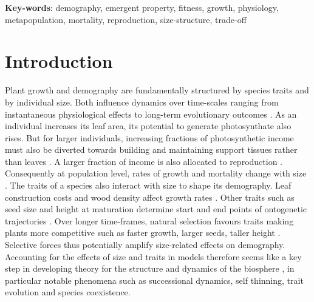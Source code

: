 \documentclass[]{article}
\begin{document}
\textbf{Key-words}: demography, emergent property, fitness, growth,
physiology, metapopulation, mortality, reproduction, size-structure,
trade-off

\section{Introduction}\label{introduction}

Plant growth and demography are fundamentally structured by species
traits and by individual size. Both influence dynamics over time-scales
ranging from instantaneous physiological effects to long-term
evolutionary outcomes \citep{Harper-1977, Westoby-2002}. As an
individual increases its leaf area, its potential to generate
photosynthate also rises. But for larger individuals, increasing
fractions of photosynthetic income must also be diverted towards
building and maintaining support tissues rather than leaves
\citep{Givnish-1988, Enquist-1999}. A larger fraction of income is also
allocated to reproduction \citep{Thomas-2011}. Consequently at
population level, rates of growth and mortality change with size
\citep{Muller-2006, Thomas-2011, Ruger-2011, Wright-2010}. The traits of
a species also interact with size to shape its demography. Leaf
construction costs and wood density affect growth rates
\citep{Wright-2010}. Other traits such as seed size and height at
maturation determine start and end points of ontogenetic trajectories
\citep{Westoby-2002}. Over longer time-frames, natural selection favours
traits making plants more competitive such as faster growth, larger
seeds, taller height \citep{Falster-2003}. Selective forces thus
potentially amplify size-related effects on demography. Accounting for
the effects of size and traits in models therefore seems like a key step
in developing theory for the structure and dynamics of the biosphere
\citep{Purves-2008, Moorcroft-2001, Falster-2003}, in particular notable
phenomena such as successional dynamics, self thinning, trait evolution
and species coexistence.
\end{document}
